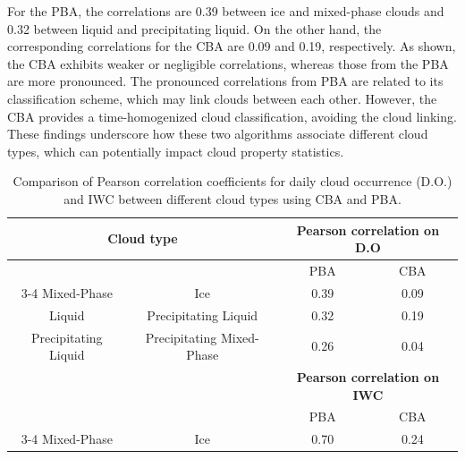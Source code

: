 For the PBA, the correlations are 0.39 between ice and mixed-phase clouds and 0.32 between liquid and precipitating liquid. On the other hand, the corresponding correlations for the CBA are 0.09 and 0.19, respectively. As shown, the CBA exhibits weaker or negligible correlations, whereas those from the PBA are more pronounced. The pronounced correlations from PBA are related to its classification scheme, which may link clouds between each other. However, the CBA provides a time-homogenized cloud classification, avoiding the cloud linking. These findings underscore how these two algorithms associate different cloud types, which can potentially impact cloud property statistics.


\begin{table}[ht!]
	\caption{Comparison of Pearson correlation coefficients for daily cloud occurrence (D.O.) and IWC between different cloud types using CBA and PBA.}
	\begin{tabular}{cccc}
		\hline
		\multicolumn{2}{c}{\textbf{Cloud type}}          & \multicolumn{2}{c}{\textbf{Pearson correlation on D.O}} \\ \hline
		\multicolumn{1}{l}{} & \multicolumn{1}{l}{}      & PBA                              & CBA                              \\ \cline{3-4} 
		Mixed-Phase          & Ice                       & 0.39                             & 0.09                             \\
		Liquid               & Precipitating Liquid      & 0.32                             & 0.19                             \\
		Precipitating Liquid & Precipitating Mixed-Phase & 0.26                             & 0.04                             \\ \hline
		\multicolumn{1}{l}{} & \multicolumn{1}{l}{}      & \multicolumn{2}{c}{\textbf{Pearson correlation on IWC}}             \\
		\multicolumn{1}{l}{} & \multicolumn{1}{l}{}      & PBA                              & CBA                              \\ \cline{3-4} 
		Mixed-Phase          & Ice                       & 0.70                             & 0.24                             \\ \hline
	\end{tabular}

	\label{tab:pearson_correlation}
\end{table}


